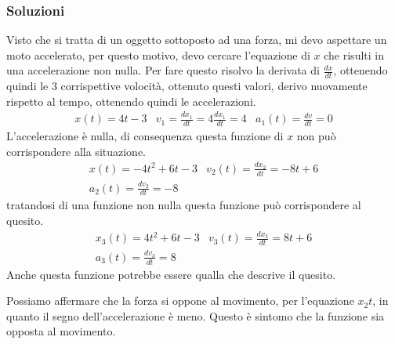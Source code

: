 \documentclass{report}
\begin{document}
\begin{enumerate}
\subsubsection{Soluzioni}
\label{sol12}

Visto che si tratta di un oggetto sottoposto ad una forza, mi devo
aspettare un moto accelerato, per questo motivo, devo cercare l'equazione
di $x$ che risulti in una accelerazione non nulla. Per fare questo
risolvo la derivata di $\frac{dx}{dt}$, ottenendo quindi le 3
corrispettive volocità, ottenuto questi valori, derivo nuovamente rispetto al tempo, ottenendo quindi le accelerazioni.
\begin{eqnarray*}
  x(t)=4t-3 & v_1=\frac{dx_1}{dt}=4\frac{dx_1}{dt}=4 & a_1(t)=\frac{dv}{dt}=0
\end{eqnarray*}
L'accelerazione è nulla, di consequenza questa funzione di $x$ non può
corrispondere alla situazione.
\begin{eqnarray*}
  x(t)=-4t^2+6t-3 & v_2(t)=\frac{dx_2}{dt}=-8t+6 \\
  a_2(t)=\frac{dv_2}{dt}= -8 
\end{eqnarray*}
tratandosi di una funzione non nulla questa funzione può corrispondere
al quesito.
\begin{eqnarray*}
  x_3(t)=4t^2+6t-3 & v_3(t)=\frac{dx_3}{dt}=8t+6\\
  a_3(t)=\frac{dv_3}{dt}=8
\end{eqnarray*}
Anche questa funzione potrebbe essere qualla che descrive il quesito.

Possiamo affermare che la forza si oppone al movimento, per l'equazione
$x_2t$, in quanto il segno dell'accelerazione è meno. Questo è sintomo
che la funzione sia opposta al movimento. 
\end{enumerate}
\end{document}

